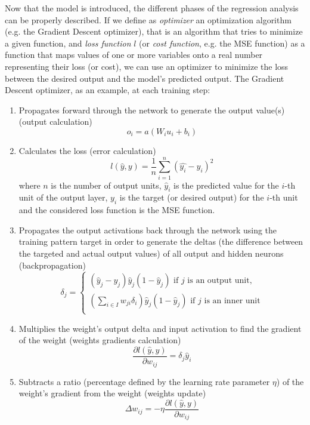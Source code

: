 \documentclass[10pt,journal,A4paper,compsoc,epsfig]{IEEEtran}
\begin{document}
Now that the model is introduced, the different phases of the regression analysis can be properly described. If we define as \textit{optimizer} an optimization algorithm (e.g. the Gradient Descent optimizer), that is an algorithm that tries to minimize a given function, and \textit{loss function} $l$ (or \textit{cost function}, e.g. the MSE function) as a function that maps values of one or more variables onto a real number representing their loss (or cost), we can use an optimizer to minimize the loss between the desired output and the model's predicted output.
The Gradient Descent optimizer, as an example, at each training step:
\begin{enumerate}
\item Propagates forward through the network to generate the output value(s) (output calculation)
\begin{equation}
o_i = a(W_iu_i + b_i)
\end{equation}
\item Calculates the loss (error calculation)
\begin{equation}
l(\hat{y}, y) = \frac{1}{n}\sum_{i=1}^n{(\hat{y_i}-y_i)^2}
\end{equation}
where $n$ is the number of output units, $\hat{y}_i$ is the predicted value for the $i$-th unit of the output layer, $y_i$ is the target (or desired output) for the $i$-th unit and the considered loss function is the MSE function.
\item Propagates the output activations back through the network using the training pattern target in order to generate the deltas (the difference between the targeted and actual output values) of all output and hidden neurons (backpropagation)
\begin{equation}
\delta_j = \begin{cases}
						(\hat{y}_j - y_j)\hat{y}_j(1 - \hat{y}_j) \textrm{ if } j \textrm{ is an output unit,} \\
						(\sum\nolimits_{i \in I} w_{ji} \delta_i)\hat{y}_j(1-\hat{y}_j) \textrm{ if } j \textrm{ is an inner unit} \\
				   \end{cases}
\end{equation}
\item Multiplies the weight's output delta and input activation to find the gradient of the weight (weights gradients calculation)
\begin{equation}
\frac{\partial l(\hat{y}, y)}{\partial w_{ij}} = \delta_j \hat{y}_i
\end{equation}
\item Subtracts a ratio (percentage defined by the learning rate parameter $\eta$) of the weight's gradient from the weight (weights update)
\begin{equation}
\Delta w_{ij} = -\eta \frac{\partial l(\hat{y}, y)}{\partial w_{ij}}
\end{equation}
\end{enumerate}
\end{document}
